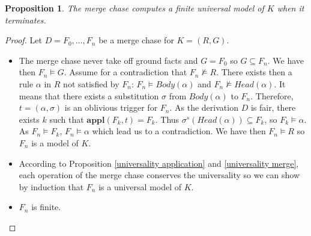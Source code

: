 \documentclass{article}
\newtheorem{proposition}{Proposition}[section]
\theoremstyle{definition}
\newtheorem{definition}{Definition}[section]
\theoremstyle{remark}
\def \N {\mathbb N}
\newcommand{\Vars}{\textbf{Vars}}
\newcommand{\Appl}{\textbf{appl}}
\begin{document}




\begin{proposition}
The merge chase computes a finite universal model of $K$ when it terminates.
\end{proposition}

\begin{proof}
Let $D = F_0,\ldots,F_n$ be a merge chase for $K =(R,G)$. 
\begin{itemize}
\item The merge chase never take off ground facts and $G =F_0$ so $G \subseteq F_n$. We have then $F_n \models G$. Assume for a contradiction that $F_n \nvDash R$. There exists then a rule $\alpha$ in $R$ not satisfied by $F_n$: $F_n \vDash \textit{Body}(\alpha)$ and $F_n \nvDash \textit{Head}(\alpha)$. It means that there exists a substitution $\sigma$ from $\textit{Body}(\alpha)$ to $F_n$. Therefore, $t=(\alpha,\sigma)$ is an oblivious trigger for $F_n$. As the derivation $D$ is fair, there exists $k$ such that $\Appl(F_k,t) = F_k$. Thus $\sigma^s(\textit{Head}(\alpha)) \subseteq F_k$, so $F_k \models \alpha$. As $F_n \models F_k$, $F_n \models \alpha$ which lead us to a contradiction. We have then $F_n \models R$ so $F_n$ is a model of $K$.
\item According to Proposition \ref{universality application} and \ref{universality merge}, each operation of the merge chase conserves the universality so we can show by induction that $F_n$ is a universal model of $K$.
\item $F_n$ is finite.
\end{itemize}
\end{proof}
\end{document}
